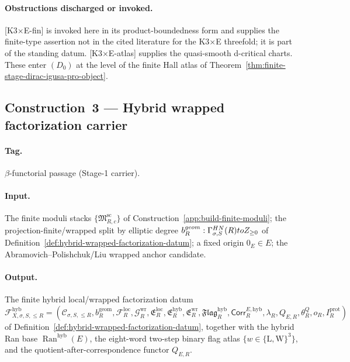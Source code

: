 \paragraph{Obstructions discharged or invoked.}
\textup{[K3$\times$E-fin]} is invoked here in its product-boundedness
form and supplies the finite-type assertion not in the cited literature
for the K3\(\times\)E threefold; it is part of the standing datum.
\textup{[K3$\times$E-atlas]} supplies the quasi-smooth d-critical
charts.  These enter \((D_0)\) at the level of the finite Hall atlas
of Theorem~\ref{thm:finite-stage-dirac-igusa-pro-object}.

\subsection{Construction~3 — Hybrid wrapped factorization carrier}
\label{app:build-hybrid-wrapped}

\paragraph{Tag.} \(\beta\)-functorial passage (Stage-1 carrier).

\paragraph{Input.}
The finite moduli stacks
\(\{\mathfrak M^{\mathrm{sc}}_{R,c}\}\) of
Construction~\ref{app:build-finite-moduli}; the
projection-finite/wrapped split by elliptic degree
\(b_R^{geom}:\Gamma_{\sigma,S}^{HN}(R)toZ_{\ge0}\) of
Definition~\ref{def:hybrid-wrapped-factorization-datum}; a fixed
origin \(0_E\in E\); the Abramovich--Polishchuk/Liu wrapped anchor
candidate.

\paragraph{Output.}
The finite hybrid local/wrapped factorization datum
\[
\mathcal F_{X,\sigma,S,\le R}^{\mathrm{hyb}}
=
(\mathcal C_{\sigma,S,\le R},
b_R^{\mathrm{geom}},
\mathcal F_R^{\mathrm{loc}},
\mathcal G_R^{\mathrm{wr}},
\mathfrak E_R^{\mathrm{loc}},
\mathfrak E_R^{\mathrm{hyb}},
\mathfrak E_R^{\mathrm{wr}},
\mathfrak{Flag}_R^{\mathrm{hyb}},
\mathsf{Corr}_R^{E,\mathrm{hyb}},
\lambda_R,
Q_{E,R},
\theta^Q_R,
o_R,
I_R^{\mathrm{prot}})
\]
of Definition~\ref{def:hybrid-wrapped-factorization-datum},
together with the hybrid Ran base
\(\operatorname{Ran}^{\mathrm{hyb}}(E)\), the eight-word two-step
binary flag atlas \(\{w\in\{\mathrm L,\mathrm W\}^3\}\), and the
quotient-after-correspondence functor \(Q_{E,R}\).

